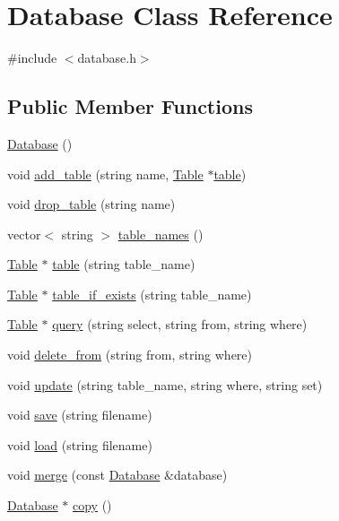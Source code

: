 \hypertarget{class_database}{\section{Database Class Reference}
\label{class_database}
}


{\ttfamily \#include $<$database.\-h$>$}

\subsection*{Public Member Functions}
\begin{DoxyCompactItemize}
\item 
\hyperlink{class_database_a4703c80e6969d33565ea340f768fdadf}{Database} ()
\item 
void \hyperlink{class_database_a1f7550b57bc33787114c40078a38e36d}{add\-\_\-table} (string name, \hyperlink{class_table}{Table} $\ast$\hyperlink{class_database_a73027c54c1f7907d48aa31a1196c4238}{table})
\item 
void \hyperlink{class_database_abe4f1ffd1e94eddfeff6634b25a8d905}{drop\-\_\-table} (string name)
\item 
vector$<$ string $>$ \hyperlink{class_database_a9706507bd920dcea216553b08e995eb7}{table\-\_\-names} ()
\item 
\hyperlink{class_table}{Table} $\ast$ \hyperlink{class_database_a73027c54c1f7907d48aa31a1196c4238}{table} (string table\-\_\-name)
\item 
\hyperlink{class_table}{Table} $\ast$ \hyperlink{class_database_a15b71527a4147465453e83c9f0cb0852}{table\-\_\-if\-\_\-exists} (string table\-\_\-name)
\item 
\hyperlink{class_table}{Table} $\ast$ \hyperlink{class_database_a0520f606f68e207ca972e1c84b625805}{query} (string select, string from, string where)
\item 
void \hyperlink{class_database_a12693f5c16b9e8c42cbaee651aa91383}{delete\-\_\-from} (string from, string where)
\item 
void \hyperlink{class_database_a16075d5f6abe6faaa9b33fdeb224fb1b}{update} (string table\-\_\-name, string where, string set)
\item 
void \hyperlink{class_database_ae6b7167bafabc6fc4227807fb15d4d83}{save} (string filename)
\item 
void \hyperlink{class_database_ab246df676fdc5e7a0968f659e819adfa}{load} (string filename)
\item 
void \hyperlink{class_database_a50aa2c5fbadfc54f2e098809d8b889ca}{merge} (const \hyperlink{class_database}{Database} \&database)
\item 
\hyperlink{class_database}{Database} $\ast$ \hyperlink{class_database_a71182e0a2e0ad7eb5af44af3b91b23fd}{copy} ()
\end{DoxyCompactItemize}


